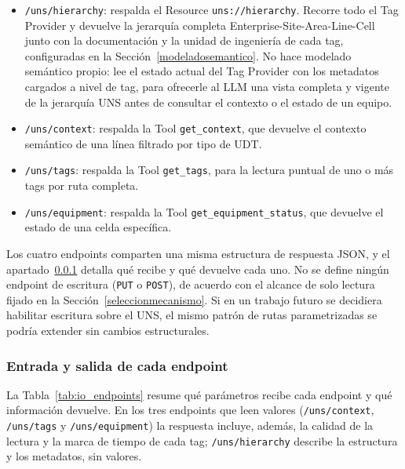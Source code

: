 \begin{itemize}
    \item \texttt{/uns/hierarchy}: respalda el Resource \texttt{uns://hierarchy}. Recorre
    todo el Tag Provider y devuelve la jerarquía completa Enterprise-Site-Area-Line-Cell
    junto con la documentación y la unidad de ingeniería de cada tag, configuradas en la
    Sección~\ref{modeladosemantico}. No hace modelado semántico propio: lee el estado actual
    del Tag Provider con los metadatos cargados a nivel de tag, para ofrecerle al LLM una vista
    completa y vigente de la jerarquía UNS antes de consultar el contexto o el estado de un
    equipo.
    \item \texttt{/uns/context}: respalda la Tool \texttt{get\_context}, que devuelve el
    contexto semántico de una línea filtrado por tipo de UDT.
    \item \texttt{/uns/tags}: respalda la Tool \texttt{get\_tags}, para la lectura puntual
    de uno o más tags por ruta completa.
    \item \texttt{/uns/equipment}: respalda la Tool \texttt{get\_equipment\_status}, que
    devuelve el estado de una celda específica.
\end{itemize}

Los cuatro endpoints comparten una misma estructura de respuesta JSON, y el apartado~\ref{especificacionendpoints} detalla qué recibe y qué devuelve cada uno. No se define ningún endpoint de escritura (\texttt{PUT} o \texttt{POST}), de acuerdo con el alcance de solo lectura fijado en la Sección~\ref{seleccionmecanismo}. Si en un trabajo futuro se decidiera habilitar escritura sobre el UNS, el mismo patrón de rutas parametrizadas se podría extender sin cambios estructurales.

\subsubsection{Entrada y salida de cada endpoint}
\label{especificacionendpoints}

La Tabla~\ref{tab:io_endpoints} resume qué parámetros recibe cada endpoint y qué información
devuelve. En los tres endpoints que leen valores (\texttt{/uns/context}, \texttt{/uns/tags} y
\texttt{/uns/equipment}) la respuesta incluye, además, la calidad de la lectura y la marca de
tiempo de cada tag; \texttt{/uns/hierarchy} describe la estructura y los metadatos, sin
valores.

